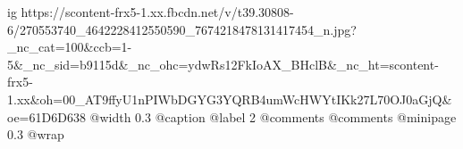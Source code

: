  
 
 
 
 

\ifcmt
  ig https://scontent-frx5-1.xx.fbcdn.net/v/t39.30808-6/270553740_4642228412550590_7674218478131417454_n.jpg?_nc_cat=100&ccb=1-5&_nc_sid=b9115d&_nc_ohc=ydwRs12FkIoAX_BHclB&_nc_ht=scontent-frx5-1.xx&oh=00_AT9ffyU1nPIWbDGYG3YQRB4umWcHWYtIKk27L70OJ0aGjQ&oe=61D6D638
  @width 0.3
  @caption @label 2
  @comments%
  @comments%
  @minipage 0.3
  @wrap \parpic[l]
\fi



    

